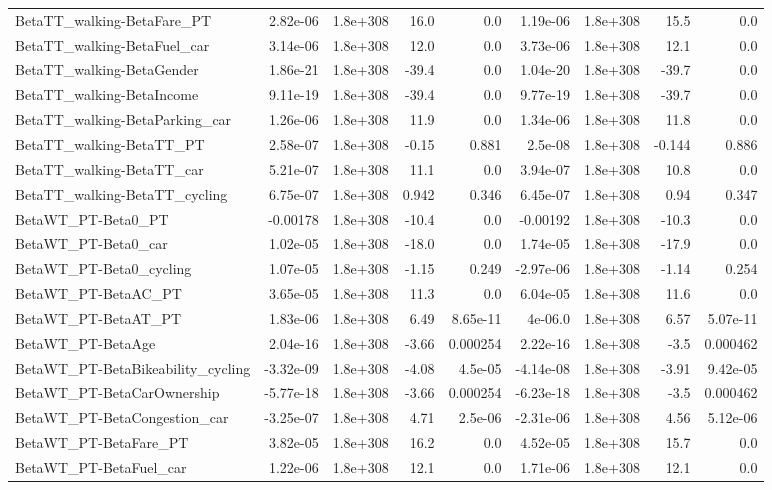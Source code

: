 \begin{tabular}{lrrrrrrrr}
BetaTT_walking-BetaFare_PT & 2.82e-06 & 1.8e+308 & 16.0 & 0.0 & 1.19e-06 & 1.8e+308 & 15.5 & 0.0 \\
BetaTT_walking-BetaFuel_car & 3.14e-06 & 1.8e+308 & 12.0 & 0.0 & 3.73e-06 & 1.8e+308 & 12.1 & 0.0 \\
BetaTT_walking-BetaGender & 1.86e-21 & 1.8e+308 & -39.4 & 0.0 & 1.04e-20 & 1.8e+308 & -39.7 & 0.0 \\
BetaTT_walking-BetaIncome & 9.11e-19 & 1.8e+308 & -39.4 & 0.0 & 9.77e-19 & 1.8e+308 & -39.7 & 0.0 \\
BetaTT_walking-BetaParking_car & 1.26e-06 & 1.8e+308 & 11.9 & 0.0 & 1.34e-06 & 1.8e+308 & 11.8 & 0.0 \\
BetaTT_walking-BetaTT_PT & 2.58e-07 & 1.8e+308 & -0.15 & 0.881 & 2.5e-08 & 1.8e+308 & -0.144 & 0.886 \\
BetaTT_walking-BetaTT_car & 5.21e-07 & 1.8e+308 & 11.1 & 0.0 & 3.94e-07 & 1.8e+308 & 10.8 & 0.0 \\
BetaTT_walking-BetaTT_cycling & 6.75e-07 & 1.8e+308 & 0.942 & 0.346 & 6.45e-07 & 1.8e+308 & 0.94 & 0.347 \\
BetaWT_PT-Beta0_PT & -0.00178 & 1.8e+308 & -10.4 & 0.0 & -0.00192 & 1.8e+308 & -10.3 & 0.0 \\
BetaWT_PT-Beta0_car & 1.02e-05 & 1.8e+308 & -18.0 & 0.0 & 1.74e-05 & 1.8e+308 & -17.9 & 0.0 \\
BetaWT_PT-Beta0_cycling & 1.07e-05 & 1.8e+308 & -1.15 & 0.249 & -2.97e-06 & 1.8e+308 & -1.14 & 0.254 \\
BetaWT_PT-BetaAC_PT & 3.65e-05 & 1.8e+308 & 11.3 & 0.0 & 6.04e-05 & 1.8e+308 & 11.6 & 0.0 \\
BetaWT_PT-BetaAT_PT & 1.83e-06 & 1.8e+308 & 6.49 & 8.65e-11 & 4e-06.0 & 1.8e+308 & 6.57 & 5.07e-11 \\
BetaWT_PT-BetaAge & 2.04e-16 & 1.8e+308 & -3.66 & 0.000254 & 2.22e-16 & 1.8e+308 & -3.5 & 0.000462 \\
BetaWT_PT-BetaBikeability_cycling & -3.32e-09 & 1.8e+308 & -4.08 & 4.5e-05 & -4.14e-08 & 1.8e+308 & -3.91 & 9.42e-05 \\
BetaWT_PT-BetaCarOwnership & -5.77e-18 & 1.8e+308 & -3.66 & 0.000254 & -6.23e-18 & 1.8e+308 & -3.5 & 0.000462 \\
BetaWT_PT-BetaCongestion_car & -3.25e-07 & 1.8e+308 & 4.71 & 2.5e-06 & -2.31e-06 & 1.8e+308 & 4.56 & 5.12e-06 \\
BetaWT_PT-BetaFare_PT & 3.82e-05 & 1.8e+308 & 16.2 & 0.0 & 4.52e-05 & 1.8e+308 & 15.7 & 0.0 \\
BetaWT_PT-BetaFuel_car & 1.22e-06 & 1.8e+308 & 12.1 & 0.0 & 1.71e-06 & 1.8e+308 & 12.1 & 0.0 \\

\end{tabular}
